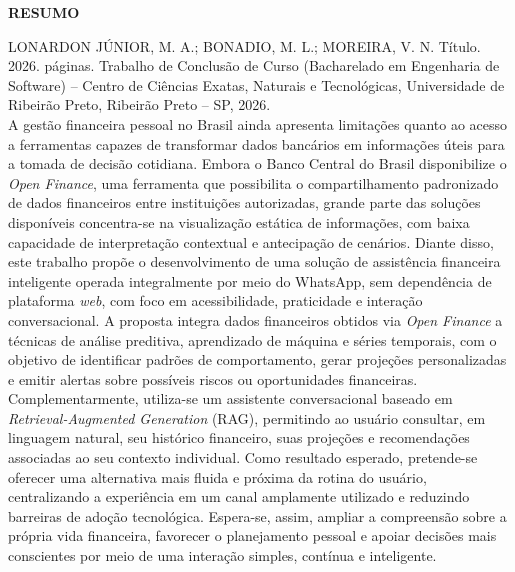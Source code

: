 \newpage
\thispagestyle{empty}
\begin{center}
    \fontsize{14pt}{14pt}\selectfont\bfseries RESUMO\\[24pt]
\end{center}

\noindent LONARDON JÚNIOR, M. A.; BONADIO, M. L.; MOREIRA, V. N. Título. 2026. \pageref{LastPage} páginas. Trabalho de Conclusão de Curso (Bacharelado em Engenharia de Software) -- Centro de Ciências Exatas, Naturais e Tecnológicas, Universidade de Ribeirão Preto, Ribeirão Preto -- SP, 2026.\\[12pt]

A gestão financeira pessoal no Brasil ainda apresenta limitações quanto ao acesso a ferramentas capazes de transformar dados bancários em informações úteis para a tomada de decisão cotidiana. Embora o Banco Central do Brasil disponibilize o \textit{Open Finance}, uma ferramenta que possibilita o compartilhamento padronizado de dados financeiros entre instituições autorizadas, grande parte das soluções disponíveis concentra-se na visualização estática de informações, com baixa capacidade de interpretação contextual e antecipação de cenários. Diante disso, este trabalho propõe o desenvolvimento de uma solução de assistência financeira inteligente operada integralmente por meio do WhatsApp, sem dependência de plataforma \textit{web}, com foco em acessibilidade, praticidade e interação conversacional. A proposta integra dados financeiros obtidos via \textit{Open Finance} a técnicas de análise preditiva, aprendizado de máquina e séries temporais, com o objetivo de identificar padrões de comportamento, gerar projeções personalizadas e emitir alertas sobre possíveis riscos ou oportunidades financeiras. Complementarmente, utiliza-se um assistente conversacional baseado em \textit{Retrieval-Augmented Generation} (RAG), permitindo ao usuário consultar, em linguagem natural, seu histórico financeiro, suas projeções e recomendações associadas ao seu contexto individual. Como resultado esperado, pretende-se oferecer uma alternativa mais fluida e próxima da rotina do usuário, centralizando a experiência em um canal amplamente utilizado e reduzindo barreiras de adoção tecnológica. Espera-se, assim, ampliar a compreensão sobre a própria vida financeira, favorecer o planejamento pessoal e apoiar decisões mais conscientes por meio de uma interação simples, contínua e inteligente.\\

